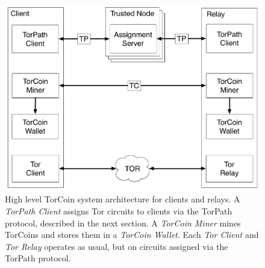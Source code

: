 \begin{figure}[t]
\centering
\includegraphics[scale=0.3]{architecture.pdf}
\caption
{
	High level TorCoin system architecture for clients and relays. A 
	\textit{TorPath Client} assigns Tor circuits to clients via the TorPath
	protocol, described in the next section. A \textit{TorCoin Miner} mines
	TorCoins 	and stores them in a \textit{TorCoin Wallet}. Each \textit{Tor
	Client} and 	\textit{Tor Relay} operates as usual, but on circuits assigned
	via the TorPath 	protocol.
}
\label{figure:archi}
\end{figure}
